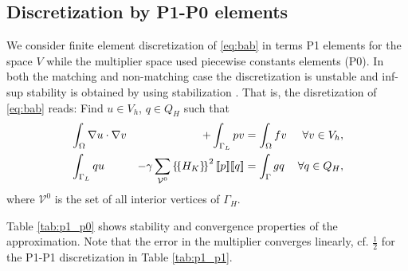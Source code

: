 \documentclass[r]{siamart171218}
\begin{document}
\subsection{Discretization by P1-P0 elements}\label{sec:p1_p0}
We consider finite element discretization of \eqref{eq:bab} in terms P1 elements
for the space $V$ while the multiplier space used piecewise constants elements
(P0). In both the matching and non-matching case the discretization is unstable
and inf-sup stability is obtained by using stabilization \cite{burman2014projection}.
That is, the disretization of \eqref{eq:bab} reads: Find $u\in V_h$, $q\in Q_H$ such that
%
\begin{equation}\label{eq:p0_stab}
\begin{aligned}
&\int_{\Omega} \nabla u\cdot \nabla v &+ \int_{\Gamma_L}p v &= \int_{\Omega} f v &\forall v\in V_h,\\
  &\int_{\Gamma_L}q u  &-\gamma \sum_{\mathcal{V}^0} \avg{H_K}^2\jump{p}\jump{q} &= \int_{\Gamma} g q &\forall q\in Q_H,
  \end{aligned}
\end{equation}
%
where $\mathcal{V}^0$ is the set of all interior vertices of $\Gamma_H$.

Table \ref{tab:p1_p0} shows stability and convergence properties of the approximation.
Note that the error in the multiplier converges linearly, cf. $\tfrac{1}{2}$ for
the P1-P1 discretization in Table \ref{tab:p1_p1}.
\end{document}
